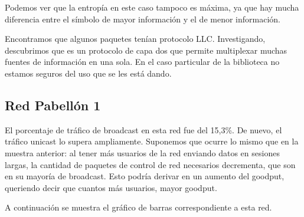 

Podemos ver que la entropía en este caso tampoco es máxima, ya que hay mucha 
diferencia entre el símbolo de mayor información y el de menor información.

Encontramos que algunos paquetes tenían protocolo LLC. Investigando, descubrimos
que es un protocolo de capa dos que permite multiplexar muchas fuentes de
información en una sola. En el caso particular de la biblioteca no
estamos seguros del uso que se les está dando.


\subsection{Red Pabellón 1}
El porcentaje de tráfico de broadcast en esta red fue del 15,3\%. De nuevo, el
tráfico unicast lo supera ampliamente. Suponemos que ocurre lo mismo que en 
la muestra anterior: al tener más usuarios de la red enviando datos en 
sesiones largas, la cantidad de paquetes de control de red necesarios 
decrementa, que son en su mayoría de broadcast.
Esto podría derivar en un aumento del goodput, queriendo decir que cuantos 
más usuarios, mayor goodput.

A continuación se muestra el gráfico de barras correspondiente a esta red.



